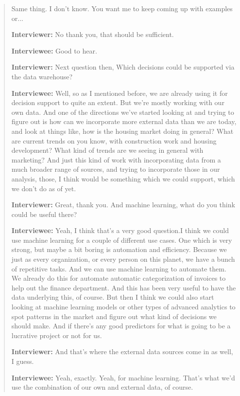 \begin{quote}
    Same thing. I don't know. You want me to keep coming up with examples or...

    \textbf{Interviewer:} No thank you, that should be sufficient.

    \textbf{Interviewee:} Good to hear.

    \textbf{Interviewer:} Next question then, Which decisions could be supported via the data warehouse?

    \textbf{Interviewee:} Well, so as I mentioned before, we are already using it for decision support to quite an extent. But we're mostly working with our own data. And one of the directions we've started looking at and trying to figure out is how can we incorporate more external data than we are today, and look at things like, how is the housing market doing in general? What are current trends on you know, with construction work and housing development? What kind of trends are we seeing in general with marketing? And just this kind of work with incorporating data from a much broader range of sources, and trying to incorporate those in our analysis, those, I think would be something which we could support, which we don't do as of yet.

    \textbf{Interviewer:} Great, thank you. And machine learning, what do you think could be useful there?

    \textbf{Interviewee:} Yeah, I think that's a very good question.I think we could use machine learning for a couple of different use cases. One which is very strong, but maybe a bit boring is automation and efficiency. Because we just as every organization, or every person on this planet, we have a bunch of repetitive tasks. And we can use machine learning to automate them. We already do this for automate automatic categorization of invoices to help out the finance department. And this has been very useful to have the data underlying this, of course. But then I think we could also start looking at machine learning models or other types of advanced analytics to spot patterns in the market and figure out what kind of decisions we should make. And if there's any good predictors for what is going to be a lucrative project or not for us.

    \textbf{Interviewer:} And that's where the external data sources come in as well, I guess.

    \textbf{Interviewee:} Yeah, exactly. Yeah, for machine learning. That's what we'd use the combination of our own and external data, of course.


\end{quote}
